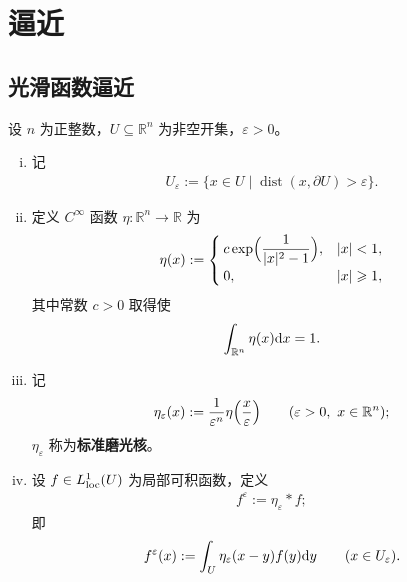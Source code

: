 \documentclass[../../main.tex]{subfiles}%
\begin{document}
\section{逼近}\label{section:ch04-02}

\subsection{光滑函数逼近}\label{subsection:ch04-02-1}

\begin{definition*}[记号与标准磨光核]
\label{definition:ch04-4-2-记号}
设 $n$ 为正整数，$U\subseteq\mathbb{R}^n$ 为非空开集，$\varepsilon>0$。
\begin{enumerate}[(i)]
\item 记
\begin{align*}
U_\varepsilon:=\{x\in U\mid\operatorname{dist}(x,\partial U)>\varepsilon\}.
\end{align*}
\item 定义 $C^\infty$ 函数 $\eta:\mathbb{R}^n\to\mathbb{R}$ 为
\begin{align*}
\eta(x):=
\begin{cases}
c\exp\Bigl(\dfrac{1}{\lvert x\rvert^2-1}\Bigr), & \lvert x\rvert<1,\\[4pt]
0, & \lvert x\rvert\geqslant1,
\end{cases}
\end{align*}
其中常数 $c>0$ 取得使
\begin{align*}
\int_{\mathbb{R}^n}\eta(x)\mathrm{d} x=1.
\end{align*}
\item 记
\begin{align*}
\eta_\varepsilon(x):=\frac{1}{\varepsilon^n}\eta\Bigl(\frac{x}{\varepsilon}\Bigr)\qquad(\varepsilon>0,\ x\in\mathbb{R}^n);
\end{align*}
$\eta_\varepsilon$ 称为\textbf{标准磨光核}。
\item 设 $f\in L^1_{\mathrm{loc}}(U)$ 为局部可积函数，定义
\begin{align*}
f^\varepsilon:=\eta_\varepsilon*f;
\end{align*}
即
\begin{align*}
f^\varepsilon(x):=\int_U\eta_\varepsilon(x-y)f(y)\mathrm{d} y\qquad(x\in U_\varepsilon).
\end{align*}
\end{enumerate}
\end{definition*}
\end{document}
